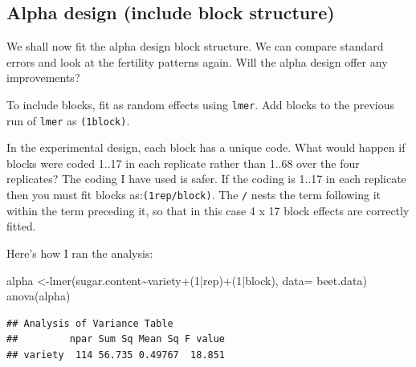 \documentclass[
]{book}
\makeatletter
\newenvironment{Shaded}{\begin{snugshade}}{\end{snugshade}}
\newcommand{\AttributeTok}[1]{\textcolor[rgb]{0.77,0.63,0.00}{#1}}
\newcommand{\DecValTok}[1]{\textcolor[rgb]{0.00,0.00,0.81}{#1}}
\newcommand{\FunctionTok}[1]{\textcolor[rgb]{0.00,0.00,0.00}{#1}}
\newcommand{\NormalTok}[1]{#1}
\newcommand{\OtherTok}[1]{\textcolor[rgb]{0.56,0.35,0.01}{#1}}
\newcommand{\SpecialCharTok}[1]{\textcolor[rgb]{0.00,0.00,0.00}{#1}}
\newcommand{\StringTok}[1]{\textcolor[rgb]{0.31,0.60,0.02}{#1}}
\newenvironment{kframe}{%
\medskip{}
\setlength{\fboxsep}{.8em}
 \def\at@end@of@kframe{}%
 \ifinner\ifhmode%
  \def\at@end@of@kframe{\end{minipage}}%
  \begin{minipage}{\columnwidth}%
 \fi\fi%
 \def\FrameCommand##1{\hskip\@totalleftmargin \hskip-\fboxsep
 \colorbox{shadecolor}{##1}\hskip-\fboxsep
     \hskip-\linewidth \hskip-\@totalleftmargin \hskip\columnwidth}%
 \MakeFramed {\advance\hsize-\width
   \@totalleftmargin\z@ \linewidth\hsize
   \@setminipage}}%
 {\par\unskip\endMakeFramed%
 \at@end@of@kframe}
\newenvironment{rmdblock}[1]
  {
  \begin{itemize}
  \renewcommand{\labelitemi}{
    \raisebox{-.7\height}[0pt][0pt]{
      {\setkeys{Gin}{width=3em,keepaspectratio}\texttt{[image: images/\#1]}}
    }
  }
  \setlength{\fboxsep}{1em}
  \begin{kframe}
  \item
  }
  {
  \end{kframe}
  \end{itemize}
  }
\newenvironment{rmdnote}
  {\begin{rmdblock}{note}}
  {\end{rmdblock}}
\makeatother
\begin{document}
\hypertarget{alpha-design-include-block-structure}{%
\subsection{Alpha design (include block structure)}\label{alpha-design-include-block-structure}}

We shall now fit the alpha design block structure. We can compare standard errors and look at the fertility patterns again. Will the alpha design offer any improvements?

To include blocks, fit as random effects using \texttt{lmer}. Add blocks to the previous run of \texttt{lmer} as \texttt{(1\textbar{}block)}.

\begin{rmdnote}
In the experimental design, each block has a unique code. What would happen if blocks were coded 1..17 in each replicate rather than 1..68 over the four replicates? The coding I have used is safer. If the coding is 1..17 in each replicate then you must fit blocks as:\texttt{(1\textbar{}rep/block)}. The \texttt{/} nests the term following it within the term preceding it, so that in this case 4 x 17 block effects are correctly fitted.
\end{rmdnote}

Here's how I ran the analysis:

\begin{Shaded}
\begin{Highlighting}[]
\NormalTok{alpha }\OtherTok{\textless{}{-}}\FunctionTok{lmer}\NormalTok{(sugar.content}\SpecialCharTok{\textasciitilde{}}\NormalTok{variety}\SpecialCharTok{+}\NormalTok{(}\DecValTok{1}\SpecialCharTok{|}\NormalTok{rep)}\SpecialCharTok{+}\NormalTok{(}\DecValTok{1}\SpecialCharTok{|}\NormalTok{block), }\AttributeTok{data=}\NormalTok{ beet.data)}
\FunctionTok{anova}\NormalTok{(alpha)}
\end{Highlighting}
\end{Shaded}

\begin{verbatim}
## Analysis of Variance Table
##         npar Sum Sq Mean Sq F value
## variety  114 56.735 0.49767  18.851
\end{verbatim}

\begin{Shaded}
\end{Shaded}
\end{document}
